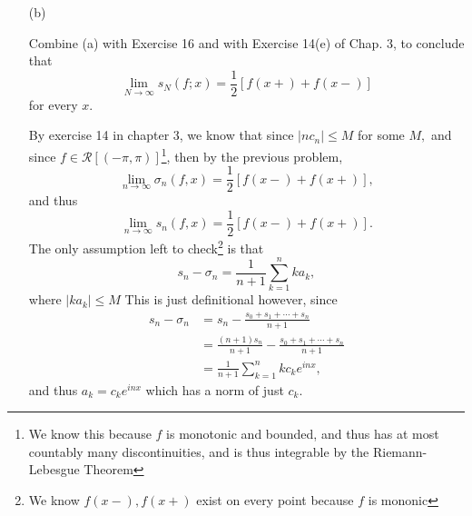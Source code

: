 \documentclass[11pt]{article}
\begin{document}
\begin{problem}
\begin{itemize}
\begin{solution}
    \end{solution}
    \item[(b)] 
    \begin{problem}
            Combine (a) with Exercise 16 and with Exercise 14(e) of Chap. 3, to conclude that
    \[
    \lim_{N \to \infty} s_N(f; x) = \frac{1}{2} [f(x+) + f(x-)]
    \]
    for every $x$.
        \end{problem}
\begin{solution}
    By exercise 14 in chapter 3, we know that since $|nc_n|\leq M$ for some $M,$ and since $f\in \mathcal{R}[(-\pi, \pi)]$\footnote{We know this because $f$ is monotonic and bounded, and thus has at most countably many discontinuities, and is thus integrable by the Riemann-Lebesgue Theorem}, then by the previous problem, 
    \[\lim_{n\to \infty} \sigma_n(f,x) = \frac{1}{2}[f(x-) + f(x+)],\] and thus
    \[\lim_{n\to \infty}s_n(f,x) = \frac{1}{2}[f(x-) + f(x+)].\] The only assumption left to check\footnote{We know $f(x-), f(x+)$ exist on every point because $f$ is mononic} is that 
    \[s_n - \sigma_n = \frac{1}{n+1}\sum_{k=1}^n k a_k,\] where $|k a_k| \leq M$ This is just definitional however, since 
    \begin{align*}
        s_n - \sigma_n &= s_n - \frac{s_0 + s_1 + \cdots + s_n}{n+1}\\
        &= \frac{(n+1)s_n}{n+1} - \frac{s_0 + s_1 + \cdots + s_n}{n+1}\\
        &= \frac{1}{n+1}\sum_{k=1}^n k c_k e^{inx},
    \end{align*}
    and thus $a_k = c_k e^{inx}$ which has a norm of just $c_k.$
    

\end{solution}
\end{itemize}
\end{problem}
\end{document}
